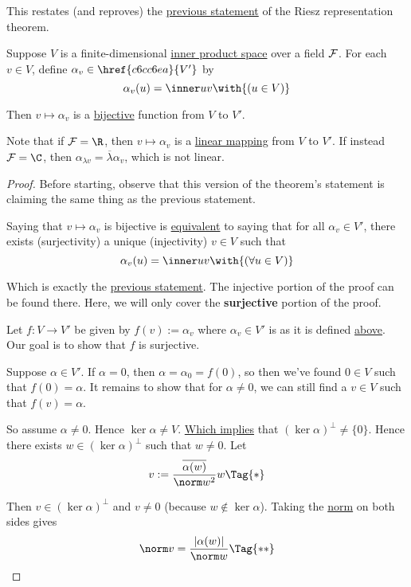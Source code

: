 This restates (and reproves) the \href{ec6fa79}{previous statement} of the
Riesz representation theorem.

Suppose $V$ is a finite-dimensional \href{b9935c8}{inner product space} over a
field $\mathcal F$. For each $v\in V$, define $\alpha_v\in\href{c6cc6ea}{V'}$ by
$$
  \alpha_v(u)=\inner uv\with{(u\in V)}
$$

Then $v\mapsto \alpha_v$ is a \href{d205f32}{bijective} function from $V$ to
$V'$.

Note that if $\F=\R$, then $v\mapsto\alpha_v$ is a \href{d7d1925}{linear
mapping} from $V$ to $V'$. If instead $\F=\C$, then $\alpha_{\lambda
v}=\overline\lambda\alpha_v$, which is not linear.

\begin{proof}
  Before starting, observe that this version of the theorem's statement is
  claiming the same thing as the previous statement.

  Saying that $v\mapsto \alpha_v$ is bijective is \href{bd75843}{equivalent} to
  saying that for all $\alpha_v\in V'$, there exists (surjectivity) a unique
  (injectivity) $v\in V$ such that
  $$
    \alpha_v(u)=\inner uv\with{(\forall u\in V)}
  $$

  Which is exactly the \href{ec6fa79}{previous statement}. The injective
  portion of the proof can be found there. Here, we will only cover the
  \textbf{surjective} portion of the proof.

  Let $f:V\to V'$ be given by $f(v):=\alpha_v$ where $\alpha_v\in V'$ is as it
  is defined \href{a1f36df}{above}. Our goal is to show that $f$ is surjective.

  Suppose $\alpha\in V'$. If $\alpha=0$, then $\alpha=\alpha_0=f(0)$, so then
  we've found $0\in V$ such that $f(0)=\alpha$. It remains to show that for
  $\alpha\neq0$, we can still find a $v\in V$ such that $f(v)=\alpha$.

  So assume $\alpha\neq0$. Hence $\ker\alpha\neq V$. \href{f8b7711}{Which
  implies} that $(\ker\alpha)^\perp\neq\{0\}$. Hence there exists
  $w\in(\ker\alpha)^\perp$ such that $w\neq0$. Let
  \begin{equation*}
    v:=\frac{\overline{\alpha(w)}}{\norm w^2}w\Tag{*}
  \end{equation*}

  Then $v\in(\ker\alpha)^\perp$ and $v\neq0$ (because $w\notin\ker\alpha$).
  Taking the \href{d828dac}{norm} on both sides gives
  \begin{equation*}
    \norm v=\frac{|\alpha(w)|}{\norm w}\Tag{**}
  \end{equation*}


\end{proof}
